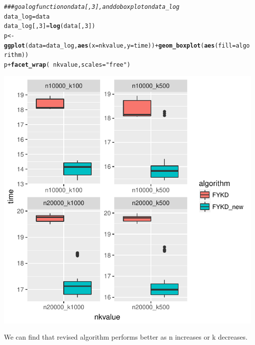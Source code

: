 \documentclass{article}\usepackage[]{graphicx}\usepackage[]{color}
\makeatletter
\def\maxwidth{ %
  \ifdim\Gin@nat@width>\linewidth
    \linewidth
  \else
    \Gin@nat@width
  \fi
}
\newcommand{\hlnum}[1]{\textcolor[rgb]{0.686,0.059,0.569}{#1}}%
\newcommand{\hlstr}[1]{\textcolor[rgb]{0.192,0.494,0.8}{#1}}%
\newcommand{\hlcom}[1]{\textcolor[rgb]{0.678,0.584,0.686}{\textit{#1}}}%
\newcommand{\hlopt}[1]{\textcolor[rgb]{0,0,0}{#1}}%
\newcommand{\hlstd}[1]{\textcolor[rgb]{0.345,0.345,0.345}{#1}}%
\newcommand{\hlkwb}[1]{\textcolor[rgb]{0.69,0.353,0.396}{#1}}%
\newcommand{\hlkwc}[1]{\textcolor[rgb]{0.333,0.667,0.333}{#1}}%
\newcommand{\hlkwd}[1]{\textcolor[rgb]{0.737,0.353,0.396}{\textbf{#1}}}%
\newenvironment{kframe}{%
 \def\at@end@of@kframe{}%
 \ifinner\ifhmode%
  \def\at@end@of@kframe{\end{minipage}}%
  \begin{minipage}{\columnwidth}%
 \fi\fi%
 \def\FrameCommand##1{\hskip\@totalleftmargin \hskip-\fboxsep
 \colorbox{shadecolor}{##1}\hskip-\fboxsep
     \hskip-\linewidth \hskip-\@totalleftmargin \hskip\columnwidth}%
 \MakeFramed {\advance\hsize-\width
   \@totalleftmargin\z@ \linewidth\hsize
   \@setminipage}}%
 {\par\unskip\endMakeFramed%
 \at@end@of@kframe}
\newenvironment{knitrout}{}{} %
\makeatother
\begin{document}
\begin{knitrout}
\color{fgcolor}\begin{kframe}
\begin{alltt}
\hlcom{###go a log function on data[,3],and do boxplot on data_log}
\hlstd{data_log}\hlkwb{=}\hlstd{data}
\hlstd{data_log[,}\hlnum{3}\hlstd{]}\hlkwb{=}\hlkwd{log}\hlstd{(data[,}\hlnum{3}\hlstd{])}
\hlstd{p}\hlkwb{<-}\hlkwd{ggplot}\hlstd{(}\hlkwc{data}\hlstd{=data_log,} \hlkwd{aes}\hlstd{(}\hlkwc{x}\hlstd{=nkvalue,}\hlkwc{y}\hlstd{=time))}\hlopt{+}\hlkwd{geom_boxplot}\hlstd{(}\hlkwd{aes}\hlstd{(}\hlkwc{fill}\hlstd{=algorithm))}
\hlstd{p}\hlopt{+} \hlkwd{facet_wrap}\hlstd{(}\hlopt{~} \hlstd{nkvalue,} \hlkwc{scales}\hlstd{=}\hlstr{"free"}\hlstd{)}
\end{alltt}
\end{kframe}
\includegraphics[width=\maxwidth]{figure/r-chunk14-1} 

\end{knitrout}

We can find that revised algorithm performs better as n increases or k decreases.
\end{document}
